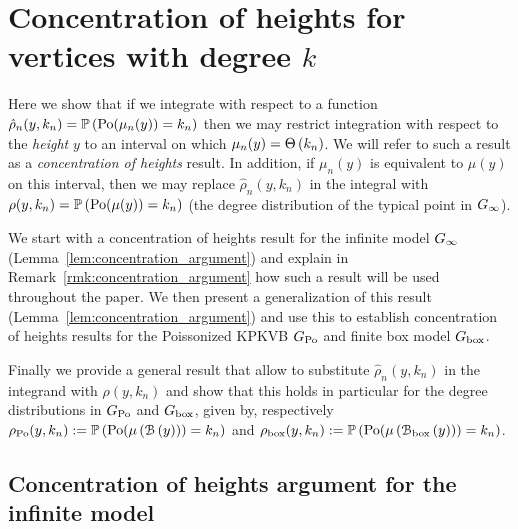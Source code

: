 \section{Concentration of heights for vertices with degree $k$}\label{sec:concentration_argument}

Here we show that if we integrate with respect to a function $\hat{\rho}_n(y,k_n) = \mathbb{P}\left({\mathrm{Po}}(\mu_n(y)) = k_n\right)$ then we may restrict integration with respect to the \emph{height} $y$ to an interval on which $\mu_n(y) = \Theta\left(k_n\right)$. We will refer to such a result as a \emph{concentration of heights} result. In addition, if $\mu_n(y)$ is equivalent to $\mu(y)$ on this interval, then we may replace $\hat{\rho}_n(y,k_n)$ in the integral with $\rho(y,k_n) = \mathbb{P}\left({\mathrm{Po}}(\mu(y)) = k_n\right)$ (the degree distribution of the typical point in $G_{\infty}$). 

We start with a concentration of heights result for the infinite model $G_{\infty}$ (Lemma~\ref{lem:concentration_argument}) and explain in Remark~\ref{rmk:concentration_argument} how such a result will be used throughout the paper. We then present a generalization of this result (Lemma~\ref{lem:concentration_argument}) and use this to establish concentration of heights results for the Poissonized KPKVB $G_{\text{Po}}$ and finite box model $G_{\text{box}}$. 

Finally we provide a general result that allow to substitute $\hat{\rho}_n(y,k_n)$ in the integrand with $\rho(y,k_n)$ and show that this holds in particular for the degree distributions in $G_{\text{Po}}$ and $G_{\text{box}}$, given by, respectively $\rho_{{\mathrm{Po}}}(y,k_n) := \mathbb{P}\left({\mathrm{Po}}(\mu\left({\mathcal B}\left(y\right)\right)) = k_n\right)$ and $\rho_{\text{box}}(y,k_n) := \mathbb{P}\left({\mathrm{Po}}(\mu\left({\mathcal B}_{\text{box}}\left(y\right)\right)) = k_n\right)$.

\subsection{Concentration of heights argument for the infinite model}

